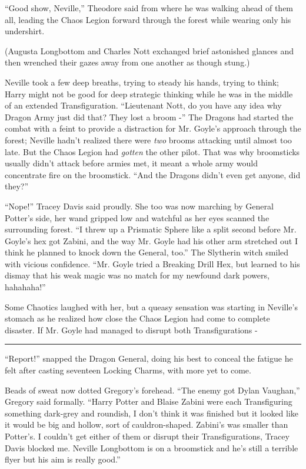 ``Good show, Neville,'' Theodore said from where he was walking ahead of
them all, leading the Chaos Legion forward through the forest while
wearing only his undershirt.

(Augusta Longbottom and Charles Nott exchanged brief astonished glances
and then wrenched their gazes away from one another as though stung.)

Neville took a few deep breaths, trying to steady his hands, trying to
think; Harry might not be good for deep strategic thinking while he was
in the middle of an extended Transfiguration. ``Lieutenant Nott, do you
have any idea why Dragon Army just did that? They lost a broom -'' The
Dragons had started the combat with a feint to provide a distraction for
Mr. Goyle's approach through the forest; Neville hadn't realized there
were \emph{two} brooms attacking until almost too late. But the Chaos
Legion had \emph{gotten} the other pilot. That was why broomsticks
usually didn't attack before armies met, it meant a whole army would
concentrate fire on the broomstick. ``And the Dragons didn't even get
anyone, did they?''

``Nope!'' Tracey Davis said proudly. She too was now marching by General
Potter's side, her wand gripped low and watchful as her eyes scanned the
surrounding forest. ``I threw up a Prismatic Sphere like a split second
before Mr. Goyle's hex got Zabini, and the way Mr. Goyle had his other
arm stretched out I think he planned to knock down the General, too.''
The Slytherin witch smiled with vicious confidence. ``Mr. Goyle tried a
Breaking Drill Hex, but learned to his dismay that his weak magic was no
match for my newfound dark powers, hahahaha!''

Some Chaotics laughed with her, but a queasy sensation was starting in
Neville's stomach as he realized how close the Chaos Legion had come to
complete disaster. If Mr. Goyle had managed to disrupt both
Transfigurations -

\begin{center}\rule{3in}{0.4pt}\end{center}

``Report!'' snapped the Dragon General, doing his best to conceal the
fatigue he felt after casting seventeen Locking Charms, with more yet to
come.

Beads of sweat now dotted Gregory's forehead. ``The enemy got Dylan
Vaughan,'' Gregory said formally. ``Harry Potter and Blaise Zabini were
each Transfiguring something dark-grey and roundish, I don't think it
was finished but it looked like it would be big and hollow, sort of
cauldron-shaped. Zabini's was smaller than Potter's. I couldn't get
either of them or disrupt their Transfigurations, Tracey Davis blocked
me. Neville Longbottom is on a broomstick and he's still a terrible
flyer but his aim is really good.''


